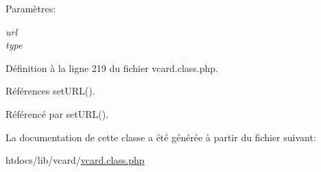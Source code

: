\begin{Desc}
\item[Param\`{e}tres:]
\begin{description}
\item[{\em url}]\item[{\em type}]\end{description}
\end{Desc}


D\'{e}finition \`{a} la ligne 219 du fichier vcard.class.php.

R\'{e}f\'{e}rences set\-URL().

R\'{e}f\'{e}renc\'{e} par set\-URL().

La documentation de cette classe a \'{e}t\'{e} g\'{e}n\'{e}r\'{e}e \`{a} partir du fichier suivant:\begin{CompactItemize}
\item 
htdocs/lib/vcard/\hyperlink{vcard_8class_8php}{vcard.class.php}\end{CompactItemize}
